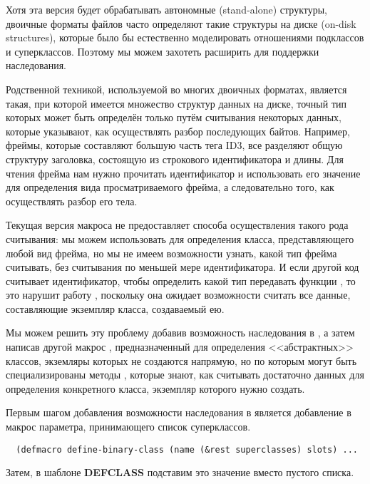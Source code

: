 Хотя эта версия  будет обрабатывать автономные (stand-alone)
структуры, двоичные форматы файлов часто определяют такие структуры на диске (on-disk
structures), которые было бы естественно моделировать отношениями подклассов и
суперклассов. Поэтому мы можем захотеть расширить  для поддержки
наследования.

Родственной техникой, используемой во многих двоичных форматах, является такая, при
которой имеется множество структур данных на диске, точный тип которых может быть
определён только путём считывания некоторых данных, которые указывают, как осуществлять
разбор последующих байтов. Например, фреймы, которые составляют большую часть тега ID3,
все разделяют общую структуру заголовка, состоящую из строкового идентификатора и
длины. Для чтения фрейма нам нужно прочитать идентификатор и использовать его значение для
определения вида просматриваемого фрейма, а следовательно того, как осуществлять разбор
его тела.

Текущая версия макроса  не предоставляет способа осуществления
такого рода считывания: мы можем использовать  для определения
класса, представляющего любой вид фрейма, но мы не имеем возможности узнать, какой тип
фрейма считывать, без считывания по меньшей мере идентификатора. И если другой код
считывает идентификатор, чтобы определить какой тип передавать функции ,
то это нарушит работу , поскольку она ожидает возможности считать все
данные, составляющие экземпляр класса, создаваемый ею.

Мы можем решить эту проблему добавив возможность наследования в
, а затем написав другой макрос
, предназначенный для определения <<абстрактных>>
классов, экземляры которых не создаются напрямую, но по которым могут быть
специализированы методы , которые знают, как считывать достаточно данных
для определения конкретного класса, экземпляр которого нужно создать.

Первым шагом добавления возможности наследования в  является
добавление в макрос параметра, принимающего список суперклассов.

\begin{lstlisting}
  (defmacro define-binary-class (name (&rest superclasses) slots) ...
\end{lstlisting}

Затем, в шаблоне \textbf{DEFCLASS} подставим это значение вместо пустого списка.

